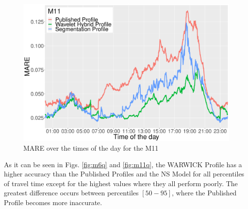 \documentclass[a4paper, 10pt, conference]{ieeeconf}      %
\begin{document}
\begin{figure}[htbp]
	\centerline{\includegraphics[width=\linewidth]{./images/M11_daytime_8_12.pdf}}
	\caption{MARE over the times of the day for the M11}
	\label{fig:m11dt}
\end{figure}

As it can be seen in Figs. \ref{fig:m6q} and \ref{fig:m11q}, the WARWICK Profile has a higher accuracy than the Published Profiles and the NS Model for all percentiles of travel time except for the highest values where they all perform poorly.
The greatest difference occurs between percentiles $[50-95]$, where the Published Profile becomes more inaccurate.
\end{document}
